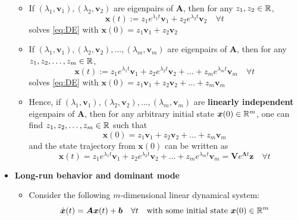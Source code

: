 \documentclass[12pt,a4paper]{article}
\begin{document}
\begin{itemize}
\begin{itemize}
  \item If $(\lambda_{1}, \bm{v}_{1}), (\lambda_{2}, \bm{v}_{2})$ are eigenpairs of $\bm{A}$,
    then for any $z_{1}, z_{2}\in \mathbb{R}$,
    \begin{equation}\nonumber%
      \bm{x}(t) := z_{1}e^{\lambda_{1}t}\bm{v}_{1} + z_{2}e^{\lambda_{2}t}\bm{v}_{2} \quad \forall t
    \end{equation}
    solves \eqref{eq:DE} with $\bm{x}(0)=z_{1}\bm{v}_{1} + z_{2}\bm{v}_{2}$

  \item If $(\lambda_{1}, \bm{v}_{1}), (\lambda_{2}, \bm{v}_{2}), \ldots, (\lambda_{m}, \bm{v}_{m})$ are eigenpairs of $\bm{A}$,
    then for any $z_{1}, z_{2},\ldots, z_{m}\in \mathbb{R}$,
    \begin{equation}\nonumber%
      \bm{x}(t) := z_{1}e^{\lambda_{1}t}\bm{v}_{1} + z_{2}e^{\lambda_{2}t}\bm{v}_{2} + \ldots + z_{m}e^{\lambda_{m}t}\bm{v}_{m} \quad \forall t
    \end{equation}
    solves \eqref{eq:DE} with $\bm{x}(0)=z_{1}\bm{v}_{1} + z_{2}\bm{v}_{2} + \ldots + z_{m}\bm{v}_{m}$

  \item Hence, if $(\lambda_{1}, \bm{v}_{1}), (\lambda_{2}, \bm{v}_{2}), \ldots, (\lambda_{m}, \bm{v}_{m})$ are \textbf{linearly independent} eigenpairs of $\bm{A}$,
    then for any arbitrary initial state $\bm{x}(0)\in \mathbb{R}^{m}$,
    one can find $z_{1}, z_{2},\ldots, z_{m}\in \mathbb{R}$ such that
    \begin{equation}\nonumber%
      \bm{x}(0)
      = z_{1}\bm{v}_{1} + z_{2}\bm{v}_{2} + \ldots + z_{m}\bm{v}_{m}
    \end{equation}
    and the state trajectory from $\bm{x}(0)$ can be written as
    \begin{equation}\nonumber%
      \bm{x}(t)
      = z_{1}e^{\lambda_{1}t}\bm{v}_{1} + z_{2}e^{\lambda_{2}t}\bm{v}_{2} + \ldots + z_{m}e^{\lambda_{m}t}\bm{v}_{m}
      =
      \bm{V}e^{\bm{\Lambda} t}\bm{z}
      \quad \forall t
    \end{equation}
    
  \end{itemize}

\item \textbf{Long-run behavior and dominant mode}
  \begin{itemize}
  \item Consider the following $m$-dimensional linear dynamical system:
    \begin{equation}\nonumber%
      \dot{\bm{x}}(t)
      =
      \bm{A}
      \bm{x}(t) + \bm{b}
      \quad \forall t\quad
      \text{with some initial state $\bm{x}(0)\in \R^{m}$}
    \end{equation}
   

\end{itemize}
\end{itemize}
\end{document}

